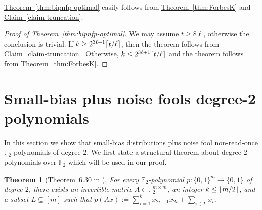 \documentclass[11pt]{article}
\numberwithin{equation}{section}
\newtheorem{theorem}{Theorem}[section]
\theoremstyle{definition}
\theoremstyle{plain}
\newcommand{\expref}[2]{\hyperref[#2]{#1~\ref{#2}}}
\newcommand{\zo}{\{0,1\}}
\def\Blocklength{\ell}
\newcommand\F{\mathbb F}
\DeclarePairedDelimiter\ceil{\lceil}{\rceil}
\DeclarePairedDelimiter\floor{\lfloor}{\rfloor}
\begin{document}
	\expref{Theorem}{thm:bipnfp-optimal} easily follows from \expref{Theorem}{thm:ForbesK} and \expref{Claim}{claim-truncation}.
  \begin{proof}[Proof of {\expref{Theorem}{thm:bipnfp-optimal}}]
    We may assume $t \ge 8\Blocklength$, otherwise the conclusion is trivial.
    If $k \ge 2^{3\Blocklength+1} \ceil{t/\Blocklength}$, then the theorem follows from \expref{Claim}{claim-truncation}.
    Otherwise, $k \le 2^{3\Blocklength+1} \ceil{t/\Blocklength}$ and the theorem follows from \expref{Theorem}{thm:ForbesK}.
  \end{proof}

%
%
%
%
%
%
%
%
%
%
%
%
%
%
%
%
%
%
%
%
%
%
%


  \section{Small-bias plus noise fools degree-2 polynomials} \label{sec:deg2poly}
In this section we show that small-bias distributions plus noise fool non-read-once $\F_2$-polynomials of degree $2$.
We first state a structural theorem about degree-$2$ polynomials over $\F_2$ which will be used in our proof.

\begin{theorem}[Theorem~6.30 in \cite{LidlN97}] \label{thm:structure-deg2}
  For every $\F_2$-polynomial $p\colon \zo^m \to \zo$ of degree $2$, there exists an invertible matrix $A \in \F_2^{m \times m}$, an integer $k \le \floor{m/2}$, and a subset $L \subseteq [m]$ such that
$p(Ax) := \sum_{i=1}^k x_{2i-1} x_{2i} + \sum_{i \in L} x_i$.
\end{theorem}
\end{document}
